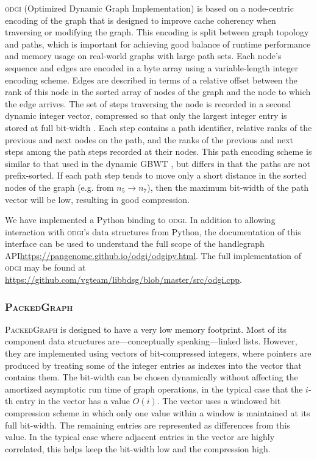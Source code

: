 \documentclass{article}
\begin{document}
\textsc{odgi} (Optimized Dynamic Graph Implementation) is based on a node-centric encoding of the graph that is designed to improve cache coherency when traversing or modifying the graph.
This encoding is split between graph topology and paths, which is important for achieving good balance of runtime performance and memory usage on real-world graphs with large path sets.
Each node's sequence and edges are encoded in a byte array using a variable-length integer encoding scheme.
Edges are described in terms of a relative offset between the rank of this node in the sorted array of nodes of the graph and the node to which the edge arrives.
The set of steps traversing the node is recorded in a second dynamic integer vector, compressed so that only the largest integer entry is stored at full bit-width \cite{prezza2017framework}.
Each step contains a path identifier, relative ranks of the previous and next nodes on the path, and the ranks of the previous and next steps among the path steps recorded at their nodes.
This path encoding scheme is similar to that used in the dynamic GBWT \cite{Siren_2019}, but differs in that the paths are not prefix-sorted.
If each path step tends to move only a short distance in the sorted nodes of the graph (e.g. from $n_{5} \to n_{7}$), then the maximum bit-width of the path vector will be low, resulting in good compression.

We have implemented a Python binding to \textsc{odgi}. 
In addition to allowing interaction with \textsc{odgi}'s data structures from Python, the documentation of this interface can be used to understand the full scope of the handlegraph API\url{https://pangenome.github.io/odgi/odgipy.html}.
The full implementation of \textsc{odgi} may be found at \url{https://github.com/vgteam/libbdsg/blob/master/src/odgi.cpp}.

\subsubsection{\textsc{PackedGraph}}

\textsc{PackedGraph} is designed to have a very low memory footprint.
Most of its component data structures are---conceptually speaking---linked lists.
However, they are implemented using vectors of bit-compressed integers, where pointers are produced by treating some of the integer entries as indexes into the vector that contains them.
The bit-width can be chosen dynamically without affecting the amortized asymptotic run time of graph operations, in the typical case that the $i$-th entry in the vector has a value $O(i)$.
The vector uses a windowed bit compression scheme in which only one value within a window is maintained at its full bit-width.
The remaining entries are represented as differences from this value.
In the typical case where adjacent entries in the vector are highly correlated, this helps keep the bit-width low and the compression high. 
\end{document}
